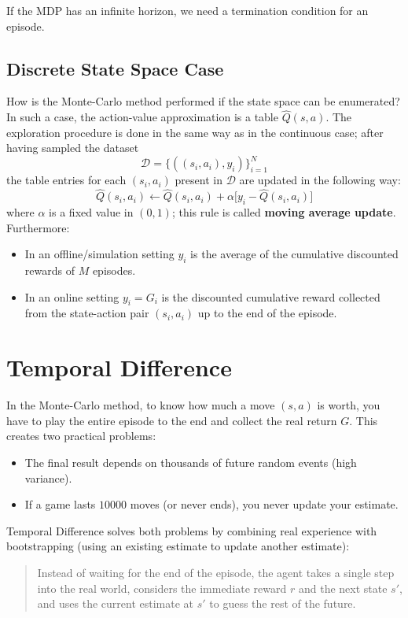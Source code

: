 \documentclass[10pt, a4paper]{report}
\begin{document}
\begin{boxobservation}{}{}
    If the MDP has an infinite horizon, we need a termination condition for an episode.
\end{boxobservation}
\subsection{Discrete State Space Case}
How is the Monte-Carlo method performed if the state space can be enumerated? In such a case, the action-value approximation is a table $\hat Q(s,a)$. The exploration procedure is done in the same way as in the continuous case; after having sampled the dataset
\begin{equation}
    \mathcal D = \{((s_i,a_i),y_i)\}_{i=1}^N
\end{equation}
the table entries for each $(s_i,a_i)$ present in $\mathcal D$ are updated in the following way:
\begin{equation}
    \boxed{\hat Q(s_i, a_i) \leftarrow \hat Q(s_i, a_i) + \alpha \big[ y_i - \hat Q(s_i, a_i) \big]}
\end{equation}
where $\alpha$ is a fixed value in $(0,1)$; this rule is called \textbf{moving average update}. Furthermore:
\begin{itemize}
    \item In an offline/simulation setting $y_i$ is the average of the cumulative discounted rewards of $M$ episodes.
    \item In an online setting $y_i=G_i$ is the discounted cumulative reward collected from the state-action pair $(s_i,a_i)$ up to the end of the episode.
\end{itemize}
\section{Temporal Difference}
In the Monte-Carlo method, to know how much a move $(s, a)$ is worth, you have to play the entire episode to the end and collect the real return $G$. This creates two practical problems:
\begin{itemize}
    \item The final result depends on thousands of future random events (high variance).
    \item If a game lasts $10000$ moves (or never ends), you never update your estimate.
\end{itemize}
Temporal Difference solves both problems by combining real experience with bootstrapping (using an existing estimate to update another estimate):
\begin{quote}
   Instead of waiting for the end of the episode, the agent takes a single step into the real world, considers the immediate reward $r$ and the next state $s'$, and uses the current estimate at $s'$ to guess the rest of the future.
\end{quote}
\end{document}
